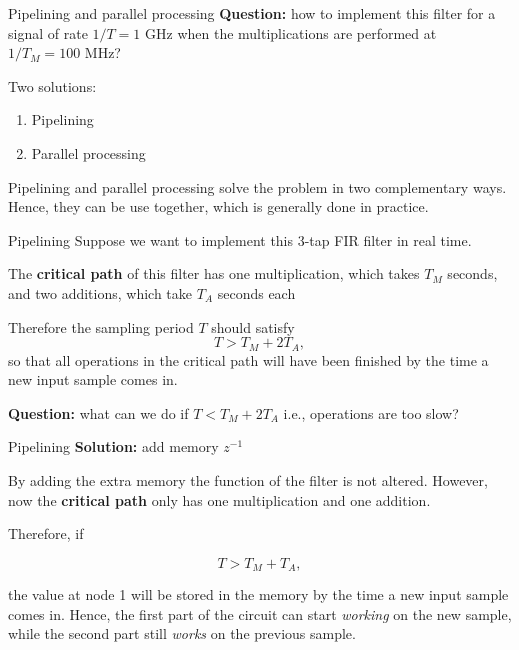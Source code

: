 \documentclass[10pt]{beamer}
\begin{document}
\begin{frame}{Pipelining and parallel processing}
\textbf{Question:} how to implement this filter for a signal of rate $1/T = 1$ GHz when the multiplications are performed at $1/T_M = 100$ MHz?

\begin{center}
	\resizebox{0.9\textwidth}{!}{}
\end{center}

Two solutions:
\begin{enumerate}
	\item Pipelining
	\item Parallel processing
\end{enumerate}

Pipelining and parallel processing solve the problem in two complementary ways. Hence, they can be use together, which is generally done in practice. 

\end{frame}

\begin{frame}{Pipelining}
Suppose we want to implement this 3-tap FIR filter in real time. 

\begin{center}
	\resizebox{0.7\textwidth}{!}{}
\end{center}

The {\color{red2} \textbf{critical path}} of this filter has one multiplication, which takes $T_M$ seconds, and two additions, which take $T_A$ seconds each

Therefore the sampling period $T$ should satisfy
\begin{equation*}
T > T_M + 2T_A,
\end{equation*}
so that all operations in the critical path will have been finished by the time a new input sample comes in.

\pause
\textbf{Question:} what can we do if $T < T_M + 2T_A$ i.e., operations are too slow? 
\end{frame}

\begin{frame}{Pipelining}
\textbf{Solution:} add memory $z^{-1}$
\begin{center}
	\def\PIPE{1}
	\resizebox{0.8\textwidth}{!}{}
\end{center}

By adding the extra memory the function of the filter is not altered. However, now the {\color{red2} \textbf{critical path}} only has one multiplication and one addition. 


Therefore, if

\begin{equation*}
T > T_M + T_A, 
\end{equation*}

the value at {\color{blue2} node 1} will be stored in the memory by the time a new input sample comes in. Hence, the first part of the circuit can start \textit{working} on the new sample, while the second part still \textit{works} on the previous sample.

\end{frame}
\end{document}
